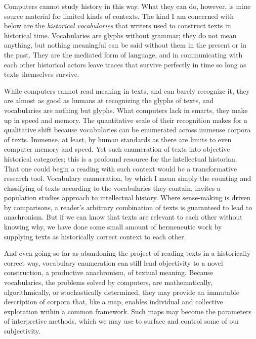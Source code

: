 \documentclass[]{book}
\theoremstyle{definition}
\theoremstyle{definition}
\theoremstyle{definition}
\theoremstyle{remark}
\begin{document}
Computers cannot study history in this way. What they can do, however,
is mine source material for limited kinds of contexts. The kind I am
concerned with below are the \emph{historical vocabularies} that writers
used to construct texts in historical time. Vocabularies are glyphs
without grammar; they do not mean anything, but nothing meaningful can
be said without them in the present or in the past. They are the
mediated form of language, and in communicating with each other
historical actors leave traces that survive perfectly in time so long as
texts themselves survive.

While computers cannot read meaning in texts, and can barely recognize
it, they are almost as good as humans at recognizing the glyphs of
texts, and vocabularies are nothing but glyphs. What computers lack in
smarts, they make up in speed and memory. The quantitative scale of
their recognition makes for a qualitative shift because vocabularies can
be enumerated across immense corpora of texts. Immense, at least, by
human standards as there are limits to even computer memory and speed.
Yet such enumeration of texts into objective historical categories; this
is a profound resource for the intellectual historian. That one could
begin a reading with such context would be a transformative research
tool. Vocabulary enumeration, by which I mean simply the counting and
classifying of texts according to the vocabularies they contain, invites
a population studies approach to intellectual history. Where
sense-making is driven by comparisons, a reader's arbitrary combination
of texts is guaranteed to lead to anachronism. But if we can know that
texts are relevant to each other without knowing why, we have done some
small amount of hermeneutic work by supplying texts as historically
correct context to each other.

And even going so far as abandoning the project of reading texts in a
historically correct way, vocabulary enumeration can still lend
objectivity to a novel construction, a productive anachronism, of
textual meaning. Because vocabularies, the problems solved by computers,
are mathematically, algorithmically, or stochastically determined, they
may provide an immutable description of corpora that, like a map,
enables individual and collective exploration within a common framework.
Such maps may become the parameters of interpretive methods, which we
may use to surface and control some of our subjectivity.
\end{document}
